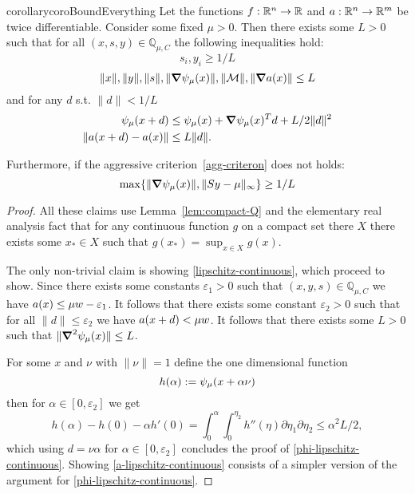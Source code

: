 \documentclass{article}
\begin{document}
\begin{restatable}{corollary}{coroBoundEverything}\label{coro:bound-everything}
Let the functions $f : \mathbb{R}^{n} \rightarrow \mathbb{R}$ and $a : \mathbb{R}^{n} \rightarrow \mathbb{R}^{m}$ be twice differentiable. Consider some fixed $\mu > 0$.
Then there exists some $L > 0$ such that for all $(x, s, y) \in \mathbb{Q}_{\mu, C}$ the following inequalities hold:
$$
s_i, y_i \ge 1/L
$$
$$
\| x \|, \| y \|, \| s \|, \| \grad \psi_{\mu}(x) \|, \| \mathcal{M} \|, \| \grad a(x) \| \le L
$$
and for any $d$ s.t. $\| d \| < 1 / L$
\begin{subequations}\label{lipschitz-continuous}
\begin{flalign}
\psi_{\mu}(x + d) &\le \psi_{\mu}(x) + \grad \psi_{\mu}(x)^T d + L / 2 \| d \|^2 \label{phi-lipschitz-continuous} \\
\| a(x + d) - a(x) \| &\le L  \| d \|. \label{a-lipschitz-continuous}
\end{flalign}
\end{subequations}

Furthermore, if the aggressive criterion~\eqref{agg-criteron} does not holds:
$$
\max\{ \| \grad \psi_{\mu}(x) \|, \| S y - \mu \|_{\infty} \} \ge 1 / L
$$
\end{restatable}

\begin{proof}
All these claims use Lemma~\ref{lem:compact-Q} and the elementary real analysis fact that for any continuous function $g$ on a compact set there $X$ there exists some $x_{*} \in X$ such that $g(x_{*}) = \sup_{x \in X}{g(x)}$.

The only non-trivial claim is showing \eqref{lipschitz-continuous}, which proceed to show. Since there exists some constants $\varepsilon_{1} > 0$ such that $(x,y,s) \in \mathbb{Q}_{\mu, C}$ we have $a(x) \le \mu w - \varepsilon_{1}$. It follows that there exists some constant $\varepsilon_2 > 0$ such that for all $\| d \| \le \varepsilon_2$ we have $a(x + d) < \mu w$. It follows that there exists some $L > 0$ such that $\| \grad^2 \psi_{\mu}(x) \| \le L$.

For some $x$ and $\nu$ with $\| \nu \| = 1$ define the one dimensional function
$$
h(\alpha) :=  \psi_{\mu}(x + \alpha \nu) 
$$
then for $\alpha \in [0, \varepsilon_2]$ we get
$$
h(\alpha) - h(0) - \alpha h'(0) = \int_{0}^{\alpha}{ \int_{0}^{\eta_{2}}{h''(\eta) \partial \eta_{1} \partial \eta_{2}} } \le \alpha^2 L / 2,
$$
which using $d = \nu \alpha$ for $\alpha \in [0, \varepsilon_2]$ concludes the proof of \eqref{phi-lipschitz-continuous}. Showing \eqref{a-lipschitz-continuous} consists of a simpler version of the argument for \eqref{phi-lipschitz-continuous}.
\end{proof}
\end{document}
